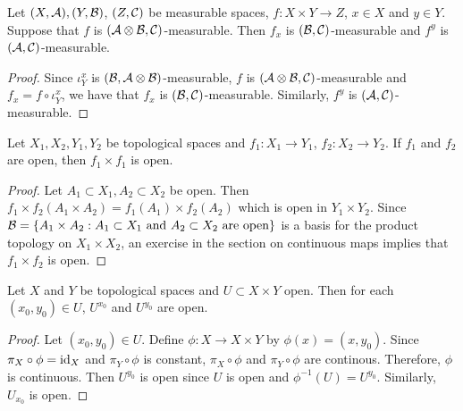 \documentclass{book}
\begin{document}
	\begin{ex}  
		Let $(X,\mathcal{A}), (Y, \mathcal{B})$, $(Z, \mathcal{C})$ be measurable spaces, $f: X \times Y \rightarrow Z$, $x \in X$ and $y \in Y$. Suppose that $f$ is $(\mathcal{A} \otimes \mathcal{B}, \mathcal{C})$-measurable. Then $f_x$ is $(\mathcal{B}, \mathcal{C})$-measurable and $f^y$ is $(\mathcal{A}, \mathcal{C})$-measurable. 
	\end{ex}
	
	\begin{proof}
		Since $\iota^x_Y$ is $(\mathcal{B}, \mathcal{A} \otimes \mathcal{B})$-measurable, $f$ is $(\mathcal{A} \otimes \mathcal{B}, \mathcal{C})$-measurable and $f_x = f \circ \iota^x_Y$, we have that $f_x$ is $(\mathcal{B}, \mathcal{C})$-measurable. Similarly, $f^y$ is $(\mathcal{A}, \mathcal{C})$-measurable.
	\end{proof}













	
	\begin{ex}
		Let $X_1, X_2,Y_1,Y_2$ be topological spaces and $f_1:X_1 \rightarrow Y_1$, $f_2:X_2 \rightarrow Y_2$. If $f_1$ and $f_2$ are open, then $f_1 \times f_1$ is open.
	\end{ex}
	
	\begin{proof}
		Let $A_1 \subset X_1, A_2 \subset X_2$ be open. Then $f_1 \times f_2(A_1 \times A_2) = f_1(A_1) \times f_2(A_2)$ which is open in $Y_1 \times Y_2$. Since $\mathcal{B} = \{A_1 \times A_2:  \text{$A_1 \subset X_1$ and $A_2 \subset X_2$ are open} \}$ is a basis for the product topology on $X_1 \times X_2$, an exercise in the section on continuous maps implies that $f_1 \times f_2$ is open.
	\end{proof}
	
	\begin{ex}
		Let $X$ and $Y$ be topological spaces and $U \subset X \times Y$ open. Then for each $(x_0,  y_0) \in U$, $U^{x_0}$ and $U^{y_0}$ are open.
	\end{ex}
	
	\begin{proof}
		Let $(x_0, y_0) \in U$. Define $\phi: X \rightarrow X \times Y$ by $\phi(x) = (x, y_0)$. Since $\pi_X \circ \phi = \operatorname{id}_X$ and $\pi_Y \circ \phi$ is constant, $\pi_X \circ \phi$ and $\pi_Y \circ \phi$ are continous. Therefore, $\phi$ is continuous. Then $U^{y_0}$ is open since $U$ is open and $\phi^{-1}(U) = U^{y_0}$. Similarly, $U_{x_0}$ is open.
	\end{proof}
	
\end{document}
